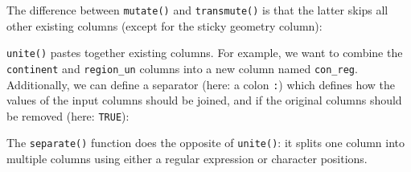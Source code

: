 \documentclass[]{krantz}
\newenvironment{Shaded}{\begin{snugshade}}{\end{snugshade}}
\newcommand{\DataTypeTok}[1]{\textcolor[rgb]{0.27,0.27,0.27}{#1}}
\newcommand{\KeywordTok}[1]{\textcolor[rgb]{0.27,0.27,0.27}{\textbf{#1}}}
\newcommand{\NormalTok}[1]{#1}
\newcommand{\OperatorTok}[1]{\textcolor[rgb]{0.43,0.43,0.43}{\textbf{#1}}}
\newcommand{\OtherTok}[1]{\textcolor[rgb]{0.37,0.37,0.37}{#1}}
\newcommand{\StringTok}[1]{\textcolor[rgb]{0.5,0.5,0.5}{#1}}
\begin{document}
\begin{Shaded}
\end{Shaded}

The difference between \texttt{mutate()} and \texttt{transmute()} is that the latter skips all other existing columns (except for the sticky geometry column):

\begin{Shaded}
\end{Shaded}

\texttt{unite()} pastes together existing columns.
For example, we want to combine the \texttt{continent} and \texttt{region\_un} columns into a new column named \texttt{con\_reg}.
Additionally, we can define a separator (here: a colon \texttt{:}) which defines how the values of the input columns should be joined, and if the original columns should be removed (here: \texttt{TRUE}):

\begin{Shaded}
\end{Shaded}

The \texttt{separate()} function does the opposite of \texttt{unite()}: it splits one column into multiple columns using either a regular expression or character positions.

\begin{Shaded}
\end{Shaded}
\end{document}
